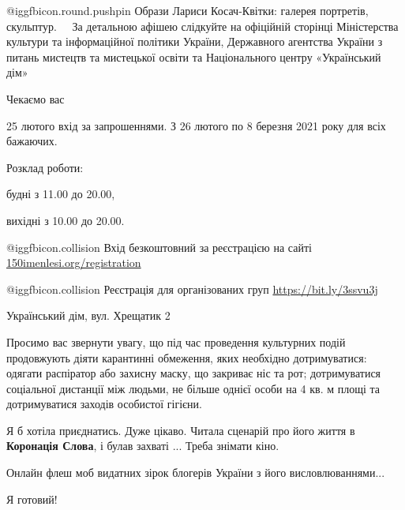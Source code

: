 \begin{itemize}
\begin{multicols}{2}
@igg{fbicon.round.pushpin}  Образи Лариси Косач-Квітки: галерея портретів, скульптур.
⠀
За детальною афішею слідкуйте на офіційній сторінці Міністерства культури та
інформаційної політики України, Державного агентства України з питань мистецтв
та мистецької освіти та Національного центру «Український дім» ⠀

Чекаємо вас

25 лютого вхід за запрошеннями.
З 26 лютого по 8 березня 2021 року для всіх бажаючих.

Розклад роботи:

будні з 11.00 до 20.00,

вихідні з 10.00 до 20.00.

@igg{fbicon.collision}  Вхід безкоштовний за реєстрацією на сайті \url{150imenlesi.org/registration}

@igg{fbicon.collision}  Реєстрація для організованих груп \url{https://bit.ly/3ssvu3j}

Український дім, вул. Хрещатик 2

Просимо вас звернути увагу, що під час проведення культурних подій продовжують
діяти карантинні обмеження, яких необхідно дотримуватися: одягати распіратор
або захисну маску, що закриває ніс та рот; дотримуватися соціальної дистанції
між людьми, не більше однієї особи на 4 кв. м площі та дотримуватися заходів
особистої гігієни.

\end{multicols}



Я б хотіла приєднатись. Дуже цікаво. Читала сценарій про його життя в \textbf{Коронація
Слова}, і булав захваті ... Треба знімати кіно.

Онлайн флеш моб видатних зірок блогерів України з його висловлюваннями...

Я готовий!

\end{itemize} %
